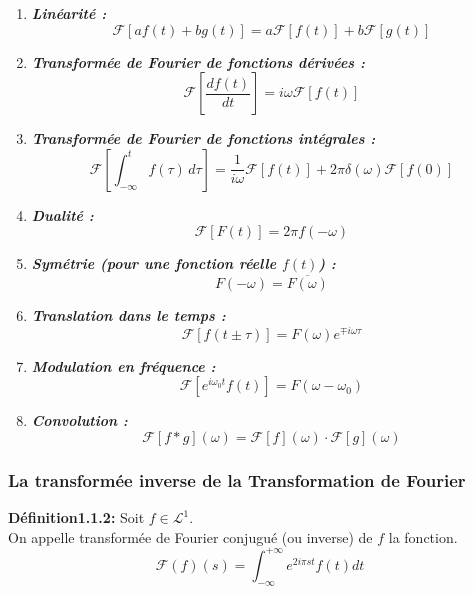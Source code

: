 \documentclass[12pt,a4paper]{report}
\begin{document}
 \begin{enumerate}
    \item \textbf{ \textit{Linéarité :}}
    \[ \mathcal{F}[a f(t) + b g(t)] = a \mathcal{F}[f(t)] + b \mathcal{F}[g(t)] \]
    
    \item \textbf{\textit{ Transformée de Fourier de fonctions dérivées :}}
    \[ \mathcal{F}\left[\frac{df(t)}{dt}\right] = i\omega \mathcal{F}[f(t)] \]
    
    \item \textbf{\textit{Transformée de Fourier de fonctions intégrales :}}
    \[ \mathcal{F}\left[\int_{-\infty}^{t} f(\tau) \, d\tau \right] = \frac{1}{i\omega} \mathcal{F}[f(t)] + 2\pi \delta(\omega) \mathcal{F}[f(0)] \]
    
    \item \textbf{\textit{ Dualité :}}
    \[ \mathcal{F}[F(t)] = 2\pi f(-\omega) \]
    
    \item \textbf{\textit{Symétrie (pour une fonction réelle \( f(t) \)) :}}
    \[ F(-\omega) = \overline{F(\omega)} \]
    
    \item \textbf{\textit{Translation dans le temps :}}
    \[ \mathcal{F}[f(t \pm \tau)] = F(\omega) e^{\mp i\omega\tau} \]
    
    \item \textbf{\textit{Modulation en fréquence :}}
    \[ \mathcal{F}[e^{i\omega_0 t} f(t)] = F(\omega - \omega_0) \]
    
    \item \textbf{\textit{Convolution :}}
    \[ \mathcal{F}[f * g](\omega) = \mathcal{F}[f](\omega) \cdot \mathcal{F}[g](\omega) \]
\end{enumerate}



 \subsubsection{ La transformée inverse de la Transformation de Fourier}

\textbf{Définition1.1.2:} Soit $f \in \mathcal{L}^{1}$.\\
On appelle transformée de Fourier conjugué (ou inverse) de $f$ la fonction.\\

\[\mathcal{F}(f)(s)= \int_{- \infty}^{+ \infty} e^{2 i \pi st} f(t) dt\]\\
\end{document}

